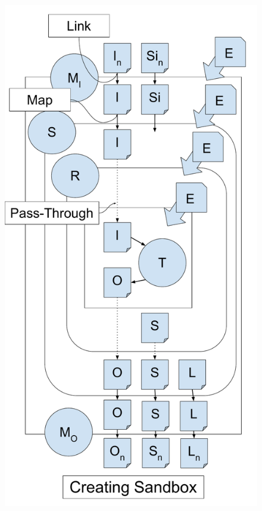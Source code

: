 \documentclass[conference]{IEEEtran}
\begin{document}
\begin{figure}[t]
\begin{minipage}[t]{0.21\textwidth}
  \includegraphics[width=\textwidth]{graphics/nested_sandbox_3_detail_wLlabel.pdf}
\end{minipage}
\begin{minipage}[t]{0.22\textwidth}

\end{minipage}
\end{figure}
\end{document}
